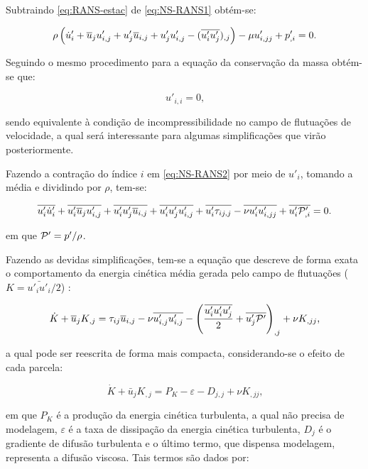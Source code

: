 Subtraindo \eqref{eq:RANS-estac} de \eqref{eq:NS-RANS1} obtém-se:

\begin{equation}
    \rho\left({\dot{u}'_i+\overline{u}_ju'_{i,j}+u'_j\overline{u}_{i,j}+u'_ju'_{i,j}-(\overline{u'_iu'_j})_{,j}}\right)-\mu u'_{i,jj}+p'_{,i}=0\text{.}
    \label{eq:NS-RANS2}
\end{equation}

Seguindo o mesmo procedimento para a equação da conservação da massa obtém-se que:

\begin{equation}
    u'_{i,i}=0\text{,}
\end{equation}

\noindent sendo equivalente à condição de incompressibilidade no campo de flutuações de velocidade, a qual será interessante para algumas simplificações que virão posteriormente.

Fazendo a contração do índice $i$ em \eqref{eq:NS-RANS2} por meio de $u'_i$, tomando a média e dividindo por $\rho$, tem-se:

\begin{equation}
    \overline{u'_i\dot{u}'_i}+\overline{u'_i\overline{u}_ju'_{i,j}}+\overline{u'_iu'_j\overline{u}_{i,j}}+\overline{u'_iu'_ju'_{i,j}}+\overline{u'_i\tau_{ij,j}}-\overline{\nu u'_iu'_{i,jj}}+\overline{u'_i\mathcal{P}'_{,i}}=0\text{.}
\end{equation}

\noindent em que $\mathcal{P}'=p'/\rho$.

Fazendo as devidas simplificações, tem-se a equação que descreve de forma exata o comportamento da energia cinética média gerada pelo campo de flutuações ($K=\bar{u'_iu'_i}/2$) \cite{alfonsi2009reynolds}:

\begin{equation}
    \dot{K}+\overline{u}_jK_{,j}=\tau_{ij}\overline{u}_{i,j}-\nu\overline{u'_{i,j}u'_{i,j}}-\left({\frac{\overline{u'_iu'_iu'_j}}{2}+\overline{u'_j\mathcal{P}'}}\right)_{,j}+\nu K_{,jj}\text{,}
\end{equation}

\noindent a qual pode ser reescrita de forma mais compacta, considerando-se o efeito de cada parcela:

\begin{equation}
    \dot{K}+\bar{u}_jK_{,j}=P_K-\varepsilon-D_{j,j}+\nu K_{,jj}\text{,}
\end{equation}

\noindent em que $P_K$ é a produção da energia cinética turbulenta, a qual não precisa de modelagem, $\varepsilon$ é a taxa de dissipação da energia cinética turbulenta, $D_j$ é o gradiente de difusão turbulenta e o último termo, que dispensa modelagem, representa a difusão viscosa. Tais termos são dados por:

